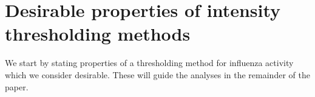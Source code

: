 \documentclass[12pt]{article}
\begin{document}
\section{Desirable properties of intensity thresholding methods}
\label{sec:desirable_properties}


We start by stating properties of a thresholding method for influenza activity which we consider desirable. These will guide the analyses in the remainder of the paper. %
\end{document}
